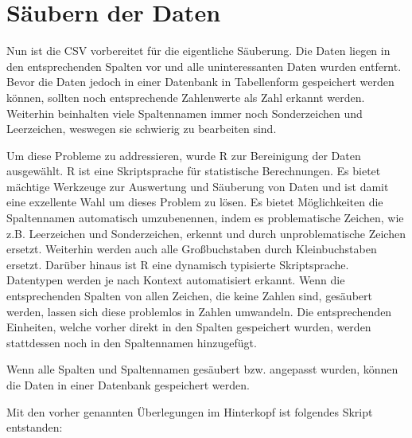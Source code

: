 \chapter{Säubern der Daten}

Nun ist die CSV vorbereitet für die eigentliche Säuberung. Die Daten liegen in den entsprechenden Spalten vor und alle uninteressanten Daten wurden entfernt.
Bevor die Daten jedoch in einer Datenbank in Tabellenform gespeichert werden können, sollten noch entsprechende Zahlenwerte als Zahl erkannt werden.
Weiterhin beinhalten viele Spaltennamen immer noch Sonderzeichen und Leerzeichen, weswegen sie schwierig zu bearbeiten sind.

Um diese Probleme zu addressieren, wurde R zur Bereinigung der Daten ausgewählt.
R ist eine Skriptsprache für statistische Berechnungen. Es bietet mächtige Werkzeuge zur Auswertung und Säuberung von Daten und ist damit eine exzellente Wahl um dieses Problem zu lösen.
Es bietet Möglichkeiten die Spaltennamen automatisch umzubenennen, indem es problematische Zeichen, wie z.B. Leerzeichen und Sonderzeichen, erkennt und durch unproblematische Zeichen ersetzt.
Weiterhin werden auch alle Großbuchstaben durch Kleinbuchstaben ersetzt.
Darüber hinaus ist R eine dynamisch typisierte Skriptsprache. Datentypen werden je nach Kontext automatisiert erkannt.
Wenn die entsprechenden Spalten von allen Zeichen, die keine Zahlen sind, gesäubert werden, lassen sich diese problemlos in Zahlen umwandeln.
Die entsprechenden Einheiten, welche vorher direkt in den Spalten gespeichert wurden, werden stattdessen noch in den Spaltennamen hinzugefügt.

Wenn alle Spalten und Spaltennamen gesäubert bzw. angepasst wurden, können die Daten in einer Datenbank gespeichert werden.

Mit den vorher genannten Überlegungen im Hinterkopf ist folgendes Skript entstanden: 


\lstset{
	breaklines=true,         %
	breakatwhitespace=false, %
	basicstyle=\ttfamily,    %
}

